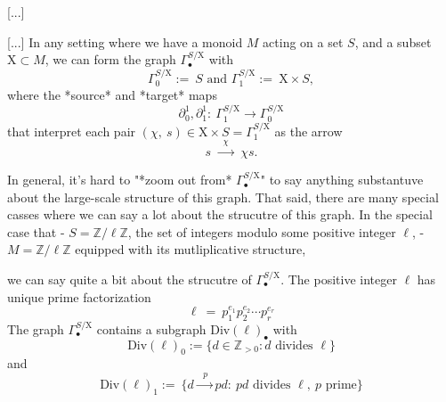 \documentclass[11pt, a4paper]{article}
\newcommand{\Chi}{\mathrm{X}}
\begin{document}
\begin{section}{[...]}

\begin{subsection}{[...]}
In any setting where we have a monoid $M$ acting on a set $S$, and a subset $\Chi\subset M$, we can form the graph $\Gamma^{S/\Chi}_{\bullet}$ with
$$
\Gamma^{S/\Chi}_{0}:=\ S\text{\ \ \ \ \ \ and\ \ \ \ \ \ }\Gamma^{S/\Chi}_{1}:=\ \Chi\times S,
$$
where the *source* and *target* maps $$\partial^{1}_0,\partial^{1}_1:\ \Gamma^{S/\Chi}_1\!\!\longrightarrow\Gamma^{S/\Chi}_{0}$$ that interpret each pair $(\chi,\ s)\in \Chi\times S=\Gamma^{S/\Chi}_1$ as the arrow $$s\ \!\xrightarrow{\ \ \ \chi\ \ \ }\ \!\chi s.$$

In general, it's hard to "*zoom out from* $\Gamma^{S/\Chi}_{\bullet}$" to say anything substantuve about the large-scale structure of this graph. That said, there are many special casses where we can say a lot about the strucutre of this graph. In the special case that 
- $S=\mathbb{Z}/\ell\mathbb{Z}$, the set of integers modulo some positive integer $\ell$,
- $M=\mathbb{Z}/\ell\mathbb{Z}$ equipped with its mutliplicative structure,

we can say quite a bit about the strucutre of $\Gamma^{S/\Chi}_{\bullet}$. The positive integer $\ell$ has unique prime factorization $$\ell\ =\ p_{1}^{e_1}p_{2}^{e_2}\cdots p_{r}^{e_r}$$ The graph $\Gamma^{S/\Chi}_{\bullet}$ contains a subgraph $\text{Div}(\ell)_{\bullet}$ with $$\text{Div}(\ell)_{0}:=\{d\in\mathbb{Z}_{>0}:d\text{\ divides\ }\ell\}$$ and $$\text{Div}(\ell)_{1}:=\ \{d\xrightarrow{\ \ \ p\ \ }pd:\ pd\text{\ divides\ }\ell,\ p\text{\ prime}\}$$
\end{subsection}
\end{section}

\cite{NeoRie}
\cite{Geo}
\cite{Cohn}




\end{document}
